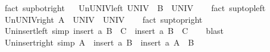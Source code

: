 \begin{isabellebody}
\isamarkupfalse%
\ {\isacharparenleft}{\kern0pt}fact\ sup{\isacharunderscore}{\kern0pt}bot{\isacharunderscore}{\kern0pt}right{\isacharparenright}{\kern0pt}%
\endisatagproof
{\isafoldproof}%
%
\isadelimproof
%
\endisadelimproof
\ \isanewline
\isanewline
{}\isamarkupfalse%
\ Un{\isacharunderscore}{\kern0pt}UNIV{\isacharunderscore}{\kern0pt}left{\isacharcolon}{\kern0pt}\ {\isachardoublequoteopen}UNIV\ {\isasymunion}\ B\ {\isacharequal}{\kern0pt}\ UNIV{\isachardoublequoteclose}\isanewline
%
\isadelimproof
\ \ %
\endisadelimproof
%
\isatagproof
{}\isamarkupfalse%
\ {\isacharparenleft}{\kern0pt}fact\ sup{\isacharunderscore}{\kern0pt}top{\isacharunderscore}{\kern0pt}left{\isacharparenright}{\kern0pt}%
\endisatagproof
{\isafoldproof}%
%
\isadelimproof
%
\endisadelimproof
\ \isanewline
\isanewline
{}\isamarkupfalse%
\ Un{\isacharunderscore}{\kern0pt}UNIV{\isacharunderscore}{\kern0pt}right{\isacharcolon}{\kern0pt}\ {\isachardoublequoteopen}A\ {\isasymunion}\ UNIV\ {\isacharequal}{\kern0pt}\ UNIV{\isachardoublequoteclose}\isanewline
%
\isadelimproof
\ \ %
\endisadelimproof
%
\isatagproof
{}\isamarkupfalse%
\ {\isacharparenleft}{\kern0pt}fact\ sup{\isacharunderscore}{\kern0pt}top{\isacharunderscore}{\kern0pt}right{\isacharparenright}{\kern0pt}%
\endisatagproof
{\isafoldproof}%
%
\isadelimproof
%
\endisadelimproof
\ \isanewline
\isanewline
{}\isamarkupfalse%
\ Un{\isacharunderscore}{\kern0pt}insert{\isacharunderscore}{\kern0pt}left\ {\isacharbrackleft}{\kern0pt}simp{\isacharbrackright}{\kern0pt}{\isacharcolon}{\kern0pt}\ {\isachardoublequoteopen}{\isacharparenleft}{\kern0pt}insert\ a\ B{\isacharparenright}{\kern0pt}\ {\isasymunion}\ C\ {\isacharequal}{\kern0pt}\ insert\ a\ {\isacharparenleft}{\kern0pt}B\ {\isasymunion}\ C{\isacharparenright}{\kern0pt}{\isachardoublequoteclose}\isanewline
%
\isadelimproof
\ \ %
\endisadelimproof
%
\isatagproof
{}\isamarkupfalse%
\ blast%
\endisatagproof
{\isafoldproof}%
%
\isadelimproof
\isanewline
%
\endisadelimproof
\isanewline
{}\isamarkupfalse%
\ Un{\isacharunderscore}{\kern0pt}insert{\isacharunderscore}{\kern0pt}right\ {\isacharbrackleft}{\kern0pt}simp{\isacharbrackright}{\kern0pt}{\isacharcolon}{\kern0pt}\ {\isachardoublequoteopen}A\ {\isasymunion}\ {\isacharparenleft}{\kern0pt}insert\ a\ B{\isacharparenright}{\kern0pt}\ {\isacharequal}{\kern0pt}\ insert\ a\ {\isacharparenleft}{\kern0pt}A\ {\isasymunion}\ B{\isacharparenright}{\kern0pt}{\isachardoublequoteclose}\isanewline
%
\isadelimproof
\ \ %
\endisadelimproof

\end{isabellebody}

